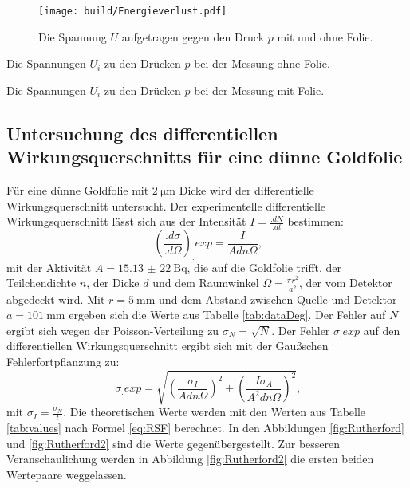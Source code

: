\begin{figure}
\centering
\texttt{[image: build/Energieverlust.pdf]}
\caption{Die Spannung $U$ aufgetragen gegen den Druck $p$ mit und ohne Folie.}
\label{fig:Foliendicke}
\end{figure}

\begin{table}
	\centering
	\caption{Die Spannungen $U_i$ zu den Drücken $p$ bei der Messung ohne Folie.}
	
	\label{tab:dataOhne}
\end{table}

\begin{table}
	\centering
	\caption{Die Spannungen $U_i$ zu den Drücken $p$ bei der Messung mit Folie.}
	
	\label{tab:dataMit}
\end{table}

\subsection{Untersuchung des differentiellen Wirkungsquerschnitts für eine dünne Goldfolie}

Für eine dünne Goldfolie mit $\SI{2}{\micro\metre}$ Dicke wird der differentielle Wirkungsquerschnitt untersucht.
Der experimentelle differentielle Wirkungsquerschnitt lässt sich aus der Intensität $I=\frac{.dN}{.dt}$ bestimmen:
\begin{equation}
\left(\frac{.d\sigma}{.d\Omega}\right)_.{exp} = \frac{I}{Adn\Omega}\text{,}\label{eq:Rutherford}
\end{equation}
mit der Aktivität $A=\SI{15,13(22)}{\becquerel}$, die auf die Goldfolie trifft, der Teilchendichte $n$, der Dicke $d$ und dem Raumwinkel $\Omega=\frac{\pi r^2}{a^2}$, der vom Detektor abgedeckt wird. Mit $r=\SI{5}{\milli\metre}$ und dem Abstand zwischen Quelle und Detektor $a=\SI{101}{\milli\meter}$ \cite{V16} ergeben sich die Werte aus Tabelle \ref{tab:dataDeg}. Der Fehler auf $N$ ergibt sich wegen der Poisson-Verteilung zu $\sigma_N= \sqrt{N}$.
Der Fehler $\sigma_.{exp}$ auf den differentiellen Wirkungsquerschnitt ergibt sich mit der Gaußschen Fehlerfortpflanzung zu:
\begin{equation}
\sigma_.{exp} =\sqrt{\left(\frac{\sigma_I}{Adn\Omega}\right)^2+\left(\frac{I\sigma_A}{A^2dn\Omega}\right)^2} 
\text{,}\label{eq:errorRutherford}
\end{equation}
mit $\sigma_I=\frac{\sigma_N}{t}$.
Die theoretischen Werte werden mit den Werten aus Tabelle \ref{tab:values} nach Formel \eqref{eq:RSF} berechnet. In  den Abbildungen \ref{fig:Rutherford} und \ref{fig:Rutherford2} sind die Werte gegenübergestellt. Zur besseren Veranschaulichung werden in Abbildung \ref{fig:Rutherford2} die ersten beiden Wertepaare weggelassen.\\
 
